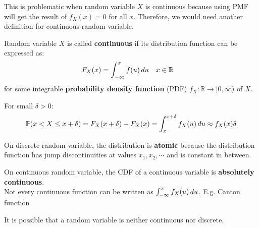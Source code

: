 \documentclass{huhtakm-template-book}
\newcommand{\prob}{\mathbb{P}}
\begin{document}
\newpage
This is problematic when random variable $X$ is continuous because using PMF will get the result of $f_{X}(x)=0$ for all $x$. Therefore, we would need another definition for continuous random variable.
\begin{defn}
	Random variable $X$ is called \textbf{continuous} if its distribution function can be expressed as:
	\begin{align*}
		F_{X}(x)&=\int_{-\infty}^{x}f(u)\,du & x&\in\mathbb{R}
	\end{align*}
	for some integrable \textbf{probability density function} (PDF) $f_{X}:\mathbb{R}\to [0,\infty)$ of $X$. 
\end{defn}
\begin{rem}
	For small $\delta>0$:
	\begin{equation*}
		\prob(x<X\leq x+\delta)=F_{X}(x+\delta)-F_{X}(x)=\intlu{x}{x+\delta}f_{X}(u)\,du\approx f_{X}(x)\delta
	\end{equation*}
\end{rem}
\begin{rem}
	On discrete random variable, the distribution is \textbf{atomic} because the distribution function has jump discontinuities at values $x_{1},x_{2},\cdots$ and is constant in between.
\end{rem}
\begin{rem}
	On continuous random variable, the CDF of a continuous variable is \textbf{absolutely continuous}.\\
	Not every continuous function can be written as $\int_{-\infty}^{x}f_{X}(u)\,du$. E.g. Canton function
\end{rem}
\begin{rem}
	It is possible that a random variable is neither continuous nor discrete.
\end{rem}
\end{document}
